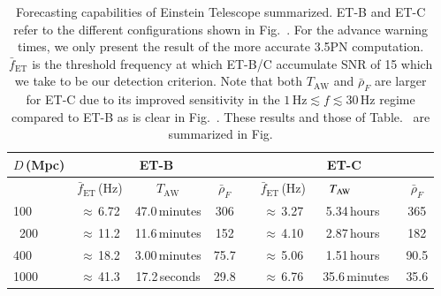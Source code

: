 \documentclass{aa}
\begin{document}
\begin{table}[h]
\caption{Forecasting capabilities of Einstein Telescope summarized. 
ET-B and ET-C refer to the different configurations shown in Fig.~. For the advance warning times, we only present the result of the more accurate 3.5PN computation. $\bar{f}_\text{ET}$ is the threshold frequency at which
ET-B/C accumulate SNR of 15 which we take to be our detection criterion. Note that both $T_\text{AW}$ and $\bar\rho_F$ are larger for ET-C
due to its improved sensitivity in the $1\,\text{Hz}\lesssim f\lesssim 30\,$Hz regime compared to ET-B as is clear in Fig.~.
These results and those of Table.~ are summarized in Fig.}
\label{table:ET}
\centering
\begin{tabular}{l|ccccccc}
\hline
$D\,$(Mpc) & \multicolumn{3}{c}{ET-B} &  & \multicolumn{3}{c}{ET-C}\\
\hline
{}& $\bar{f}_\text{ET}\,$(Hz) & \ \hspace{7mm} $T_\text{AW}$ \ \hspace{7mm} & $\bar{\rho}_{F}$ &{} & $\bar{f}_\text{ET}\,$(Hz) & \ \hspace{5mm} $T_\text{AW}\hspace{12mm}$& $\bar{\rho}_{F}$\\
100 & $\approx\,$6.72 &  47.0\,minutes & 306 &{\qquad} & $\approx\,$3.27 & 5.34\,hours\ & 365\\\
200 & $\approx\,$11.2 & 11.6\,minutes & 152 &{\qquad} & $\approx\,$4.10 & 2.87\,hours\ & 182 \\
400 & $\approx\,$18.2 & 3.00\,minutes & 75.7 &{\qquad} & $\approx\,$5.06 & 1.51\,hours\ & 90.5\\
1000 & $\approx\,$41.3 &17.2\,seconds & 29.8& \qquad &    $\approx\,$6.76 & 35.6\,minutes & 35.6  \\
\hline
\end{tabular}
\end{table}


\newpage
\end{document}
